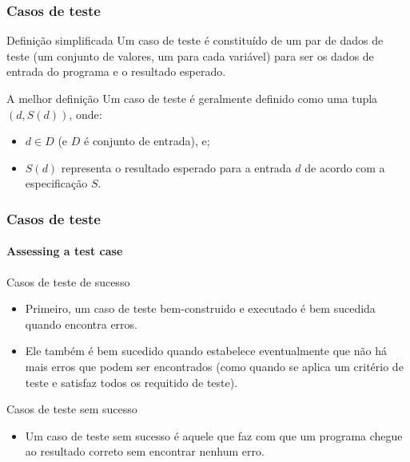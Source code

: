\begin{frame}[parent={cmap:software-testing-foundations}, hasprev=false, hasnext=true]
\frametitle{Casos de teste}
\label{concept:test-case}
\label{concept:input-domain}
\label{concept:output-domain}
\label{concept:input-data}
\label{concept:output-data}

\begin{block:concept}{Definição simplificada}
Um caso de teste é constituído de um par de dados de teste (um conjunto de valores, um para cada variável) para ser os dados de entrada do programa e o resultado esperado.
\end{block:concept}


\begin{block:concept}{A melhor definição}
Um caso de teste é geralmente definido como uma tupla $(d, S(d))$, onde:
\begin{itemize}
	\item $d \in D$ (e $D$ é conjunto de entrada), e;
	\item $S(d)$ representa o resultado esperado para a entrada $d$ de acordo com a especificação $S$.
\end{itemize}
\end{block:concept}

\hfill
{}
\end{frame}


\begin{frame}[hasprev=false, hasnext=true]
\frametitle{Casos de teste}
\framesubtitle{Assessing a test case}
\label{concept:test-case-success}
\label{concept:test-case-failure}

\begin{block:fact}{Casos de teste de sucesso}
\begin{itemize}
	\item Primeiro, um caso de teste bem-construido e executado é bem sucedida quando encontra erros.~\cite[p. 7]{myers:2004}

	\item Ele também é bem sucedido quando estabelece eventualmente que não há mais erros que podem ser encontrados (como quando se aplica um critério de teste e satisfaz todos os requitido de teste).
\end{itemize}
\end{block:fact}

\begin{block:fact}{Casos de teste sem sucesso}
\begin{itemize}
	\item Um caso de teste sem sucesso é aquele que faz com que um programa chegue ao resultado correto sem encontrar nenhum erro.
\end{itemize}
\end{block:fact}

\hfill
{}
\end{frame}



